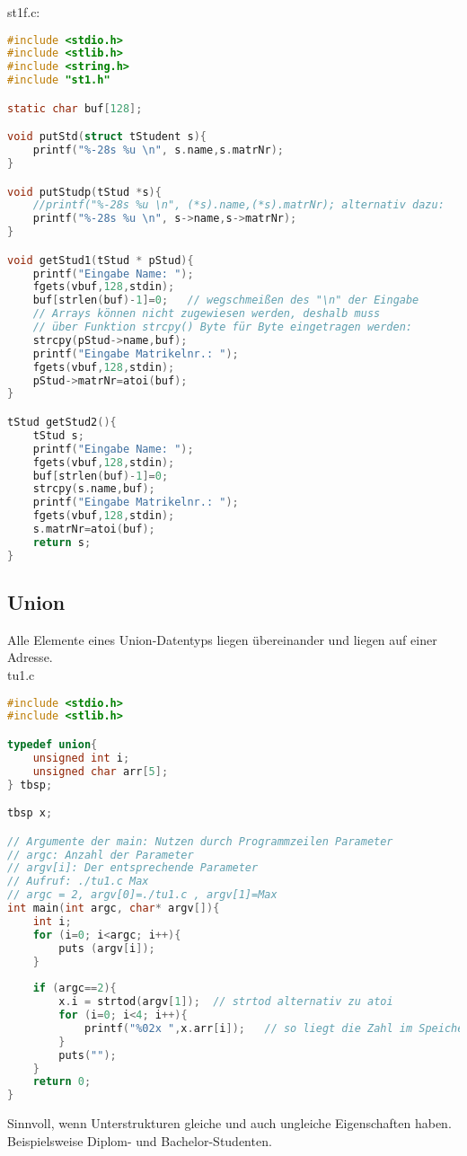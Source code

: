 st1f.c:
\begin{lstlisting}[language=C]
#include <stdio.h>
#include <stlib.h>
#include <string.h>
#include "st1.h"

static char buf[128]; 

void putStd(struct tStudent s){
	printf("%-28s %u \n", s.name,s.matrNr);
}

void putStudp(tStud *s){
	//printf("%-28s %u \n", (*s).name,(*s).matrNr); alternativ dazu:
	printf("%-28s %u \n", s->name,s->matrNr);
}

void getStud1(tStud * pStud){
	printf("Eingabe Name: ");
	fgets(vbuf,128,stdin); 
	buf[strlen(buf)-1]=0;	// wegschmeißen des "\n" der Eingabe
	// Arrays können nicht zugewiesen werden, deshalb muss 
	// über Funktion strcpy() Byte für Byte eingetragen werden:
	strcpy(pStud->name,buf);
	printf("Eingabe Matrikelnr.: "); 
	fgets(vbuf,128,stdin); 
	pStud->matrNr=atoi(buf);
}

tStud getStud2(){
	tStud s;
	printf("Eingabe Name: ");
	fgets(vbuf,128,stdin); 
	buf[strlen(buf)-1]=0;
	strcpy(s.name,buf);
	printf("Eingabe Matrikelnr.: "); 
	fgets(vbuf,128,stdin); 
	s.matrNr=atoi(buf);
	return s;
}
\end{lstlisting}
\subsection{Union}
Alle Elemente eines Union-Datentyps liegen übereinander und liegen auf einer Adresse. \medskip\\
tu1.c
\begin{lstlisting}[language=C]
#include <stdio.h>
#include <stlib.h>

typedef union{
	unsigned int i;
	unsigned char arr[5];
} tbsp;

tbsp x;

// Argumente der main: Nutzen durch Programmzeilen Parameter
// argc: Anzahl der Parameter
// argv[i]: Der entsprechende Parameter
// Aufruf: ./tu1.c Max
// argc = 2, argv[0]=./tu1.c , argv[1]=Max
int main(int argc, char* argv[]){
	int i;
	for (i=0; i<argc; i++){
		puts (argv[i]);
	}
	
	if (argc==2){
		x.i = strtod(argv[1]);	// strtod alternativ zu atoi
		for (i=0; i<4; i++){
			printf("%02x ",x.arr[i]);	// so liegt die Zahl im Speicher
		}
		puts("");
	}
	return 0;
}

\end{lstlisting}

Sinnvoll, wenn Unterstrukturen gleiche und auch ungleiche Eigenschaften haben. Beispielsweise Diplom- und Bachelor-Studenten.

